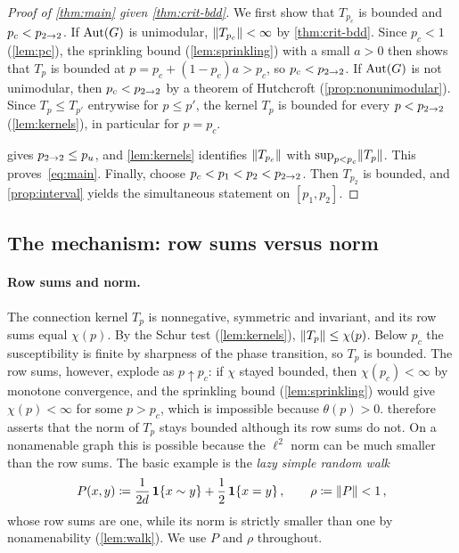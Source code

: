 \begin{proof}[Proof of \cref{thm:main} given \cref{thm:crit-bdd}]
We first show that $T_{p_c}$ is bounded and $p_c<p_{2\to 2}$. If $\operatorname{Aut}(G)$ is unimodular,
$\lVert T_{p_c}\rVert<\infty$ by \cref{thm:crit-bdd}. Since $p_c<1$ (\cref{lem:pc}), the sprinkling bound
(\cref{lem:sprinkling}) with a small $a>0$ then shows that $T_p$ is bounded at
$p=p_c+(1-p_c)a>p_c$, so $p_c<p_{2\to 2}$. If $\operatorname{Aut}(G)$ is not unimodular, then $p_c<p_{2\to 2}$ by a theorem of
Hutchcroft (\cref{prop:nonunimodular}). Since $T_p\le T_{p'}$ entrywise for $p\le p'$, the kernel
$T_p$ is bounded for every $p<p_{2\to 2}$ (\cref{lem:kernels}), in particular for $p=p_c$.

 gives $p_{2\to 2}\le p_u$, and \cref{lem:kernels} identifies $\lVert T_{p_c}\rVert$ with
$\sup_{p<p_c}\lVert T_p\rVert$. This proves~\eqref{eq:main}. Finally, choose $p_c<p_1<p_2<p_{2\to 2}$. Then $T_{p_2}$
is bounded, and \cref{prop:interval} yields the simultaneous statement on $[p_1,p_2]$.
\end{proof}

\subsection{The mechanism: row sums versus norm}\label{sec:mechanism}

\paragraph{Row sums and norm.}
The connection kernel $T_p$ is nonnegative, symmetric and invariant, and its row sums equal $\chi(p)$.
By the Schur test (\cref{lem:kernels}), $\lVert T_p\rVert\le\chi(p)$. Below $p_c$ the susceptibility is finite
by sharpness of the phase transition, so $T_p$ is bounded. The row sums, however, explode as
$p\uparrow p_c$: if $\chi$ stayed bounded, then $\chi(p_c)<\infty$ by monotone convergence, and the
sprinkling bound (\cref{lem:sprinkling}) would give $\chi(p)<\infty$ for some $p>p_c$, which is
impossible because $\theta(p)>0$.  therefore asserts that the norm of $T_p$ stays
bounded although its row sums do not. On a nonamenable graph this is possible because the $\ell^2$ norm
can be much smaller than the row sums. The basic example is the \emph{lazy simple random walk}
\begin{equation*}
  P(x,y)\coloneqq\frac{1}{2d}\,\mathbf{1}\{x\sim y\}+\frac12\,\mathbf{1}\{x=y\}\,,
  \qquad
  \rho\coloneqq\lVert P\rVert<1\,,
\end{equation*}
whose row sums are one, while its norm is strictly smaller than one by nonamenability
(\cref{lem:walk}). We use $P$ and $\rho$ throughout.

